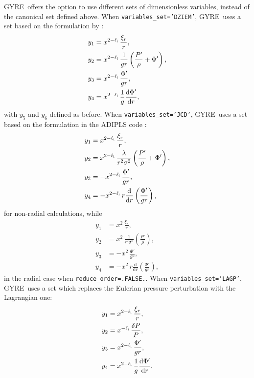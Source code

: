 \documentclass[fleqn]{article}
\newcommand{\gyre}{GYRE}
\newcommand{\diff}{\mathrm{d}}
\newcommand{\elli}{\ell_{\rm i}}
\begin{document}
\gyre\ offers the option to use different sets of dimensionless
variables, instead of the canonical set defined above. When
\texttt{variables\_set='DZIEM'}, \gyre\ uses a set based on the
formulation by \citet{Dziembowski:1971aa}:
\begin{align*}
y_{1} &= x^{2-\elli}\, \frac{\xi_{r}}{r}, \\
y_{2} &= x^{2-\elli}\, \frac{1}{g r} \left( \frac{P'}{\rho} + \Phi' \right), \\
y_{3} &= x^{2-\elli}\, \frac{\Phi'}{gr}, \\
y_{4} &= x^{2-\elli}\, \frac{1}{g} \frac{\diff \Phi'}{\diff r},
\end{align*}
with $y_{5}$ and $y_{6}$ defined as before. When
\texttt{variables\_set='JCD'}, \gyre\ uses a set based on the
formulation in the ADIPLS code \citep{Christensen-Dalsgaard:2008ab}:
\begin{align*}
y_{1} &= x^{2-\elli}\, \frac{\xi_{r}}{r}, \\
y_{2} &= x^{2-\elli}\, \frac{\lambda}{r^{2} \sigma^{2}} \left( \frac{P'}{\rho} + \Phi' \right), \\
y_{3} &= - x^{2-\elli}\, \frac{\Phi'}{gr}, \\
y_{4} &= - x^{2-\elli}\, r \frac{\diff}{\diff r} \left( \frac{\Phi'}{g r} \right),
\end{align*}
for non-radial calculations, while
\begin{align*}
y_{1} &= x^{2}\, \frac{\xi_{r}}{r}, \\
y_{2} &= x^{2}\, \frac{1}{r^{2} \sigma^{2}} \left( \frac{P'}{\rho} \right), \\
y_{3} &= - x^{2}\, \frac{\Phi'}{gr}, \\
y_{4} &= - x^{2}\, r \frac{\diff}{\diff r} \left( \frac{\Phi'}{g r} \right),
\end{align*}
in the radial case when \texttt{reduce\_order=.FALSE.}. When
\texttt{variables\_set='LAGP'}, \gyre\ uses a set which replaces the
Eulerian pressure perturbation with the Lagrangian one:
\begin{align*}
y_{1} &= x^{2-\elli}\, \frac{\xi_{r}}{r}, \\
y_{2} &= x^{ -\elli}\, \frac{\delta P}{P}, \\
y_{3} &= x^{2-\elli}\, \frac{\Phi'}{gr}, \\
y_{4} &= x^{2-\elli}\, \frac{1}{g} \frac{\diff \Phi'}{\diff r}.
\end{align*}



\end{document}
